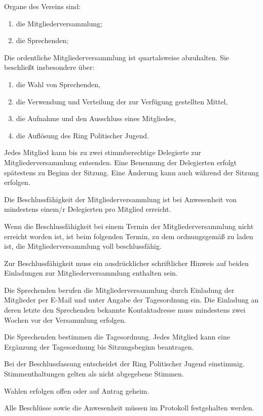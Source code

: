 \documentclass[10pt,a4paper,oneside,parskip=half]{scrartcl}
\begin{document}
\begin{contract}
Organe des Vereins sind:
\begin{enumerate}
\item die Mitgliederversammlung;
\item die Sprechenden;
\end{enumerate}

Die ordentliche Mitgliederversammlung ist quartalsweise abzuhalten. Sie beschließt insbesondere über:
\begin{enumerate}
\item die Wahl von Sprechenden,
\item die Verwendung und Verteilung der zur Verfügung gestellten Mittel,
\item die Aufnahme und den Ausschluss eines Mitgliedes,
\item die Auflösung des Ring Politischer Jugend.
\end{enumerate}

Jedes Mitglied kann bis zu zwei stimmberechtige Delegierte zur Mitgliederversammlung entsenden. Eine Benennung der Delegierten erfolgt spätestens zu Beginn der Sitzung. Eine Änderung kann auch während der Sitzung erfolgen.

Die Beschlussfähigkeit der Mitgliederversammlung ist bei Anwesenheit von mindestens einem/r Delegierten pro Mitglied erreicht.

Wenn die Beschlussfähigkeit bei einem Termin der Mitgliederversammlung nicht erreicht worden ist, ist beim folgenden Termin, zu dem ordnungsgemäß zu laden ist, die Mitgliederversammlung voll beschlussfähig.

Zur Beschlussfähigkeit muss ein ausdrücklicher schriftlicher Hinweis auf beiden Einladungen zur Mitgliederversammlung enthalten sein.

Die Sprechenden berufen die Mitgliederversammlung durch Einladung der Mitglieder per E-Mail und unter Angabe der Tagesordnung ein. Die Einladung an deren letzte den Sprechenden bekannte Kontaktadresse muss mindestens zwei Wochen vor der Versammlung erfolgen.

Die Sprechenden bestimmen die Tagesordnung. Jedes Mitglied kann eine Ergänzung der Tagesordnung bis Sitzungsbeginn beantragen.

Bei der Beschlussfassung entscheidet der Ring Politischer Jugend einstimmig. Stimmenthaltungen gelten als nicht abgegebene Stimmen.

Wahlen erfolgen offen oder auf Antrag geheim.

Alle Beschlüsse sowie die Anwesenheit müssen im Protokoll festgehalten werden.


\end{contract}
\end{document}
